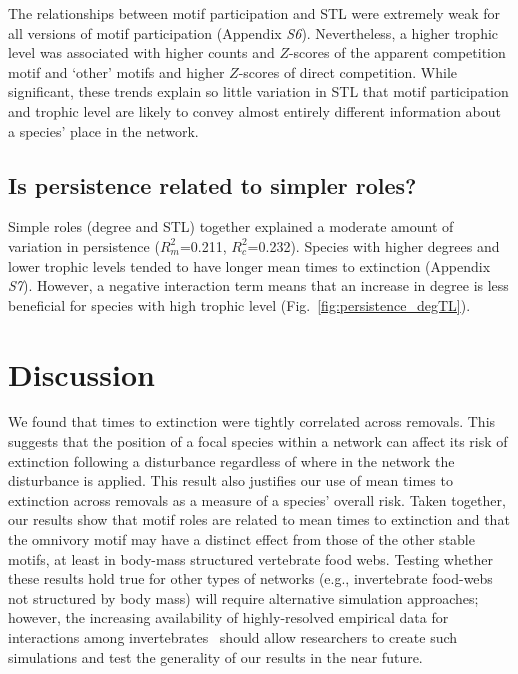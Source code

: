 \documentclass[12pt]{article}
\begin{document}
\begin{spacing}{2.0}
    
        The relationships between motif participation and STL were extremely weak for all versions of motif participation (Appendix \emph{S6}).
        Nevertheless, a higher trophic level was associated with higher counts and $Z$-scores of the apparent competition motif and `other' motifs and higher $Z$-scores of direct competition.
        While significant, these trends explain so little variation in STL that motif participation and trophic level are likely to convey almost entirely different information about a species' place in the network.
    

    \subsection*{Is persistence related to simpler roles?}
    
        Simple roles (degree and STL) together explained a moderate amount of variation in persistence ($R^2_m$=0.211, $R^2_c$=0.232).
        Species with higher degrees and lower trophic levels tended to have longer mean times to extinction (Appendix \emph{S7}).
        However, a negative interaction term means that an increase in degree is less beneficial for species with high trophic level (Fig.~\ref{fig:persistence_degTL}).
    
    
\section*{Discussion}

    We found that times to extinction were tightly correlated across removals. 
    This suggests that the position of a focal species within a network can affect its risk of extinction following a disturbance regardless of where in the network the disturbance is applied. This result also justifies our use of mean times to extinction across removals as a measure of a species' overall risk.
    Taken together, our results show that motif roles are related to mean times to extinction and that the omnivory motif may have a distinct effect from those of the other stable motifs, at least in body-mass structured vertebrate food webs.
    Testing whether these results hold true for other types of networks (e.g., invertebrate food-webs not structured by body mass) will require alternative simulation approaches; however, the increasing availability of highly-resolved empirical data for interactions among invertebrates~\citep{} should allow researchers to create such simulations and test the generality of our results in the near future.



\end{spacing}
\end{document}
